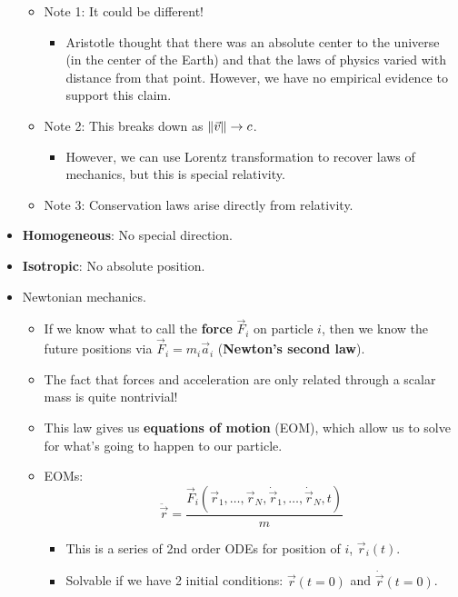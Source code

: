 \documentclass[../notes.tex]{subfiles}
\begin{document}
\begin{itemize}
\begin{itemize}
        \item Note 1: It could be different!
        \begin{itemize}
            \item Aristotle thought that there was an absolute center to the universe (in the center of the Earth) and that the laws of physics varied with distance from that point. However, we have no empirical evidence to support this claim.
        \end{itemize}
        \item Note 2: This breaks down as $\norm{\vec{v}}\to c$.
        \begin{itemize}
            \item However, we can use Lorentz transformation to recover laws of mechanics, but this is special relativity.
        \end{itemize}
        \item Note 3: Conservation laws arise directly from relativity.
    \end{itemize}
    \item \textbf{Homogeneous}: No special direction.
    \item \textbf{Isotropic}: No absolute position.
    \item Newtonian mechanics.
    \begin{itemize}
        \item If we know what to call the \textbf{force} $\vec{F}_i$ on particle $i$, then we know the future positions via $\vec{F}_i=m_i\vec{a}_i$ (\textbf{Newton's second law}).
        \item The fact that forces and acceleration are only related through a scalar mass is quite nontrivial!
        \item This law gives us \textbf{equations of motion} (EOM), which allow us to solve for what's going to happen to our particle.
        \item EOMs:
        \begin{equation*}
            \ddot{\vec{r}} = \frac{\vec{F}_i(\vec{r}_1,\dots,\vec{r}_N,\dot{\vec{r}}_1,\dots,\dot{\vec{r}}_N,t)}{m}
        \end{equation*}
        \begin{itemize}
            \item This is a series of 2nd order ODEs for position of $i$, $\vec{r}_i(t)$.
            \item Solvable if we have 2 initial conditions: $\vec{r}(t=0)$ and $\dot{\vec{r}}(t=0)$.
        \end{itemize}

\end{itemize}
\end{itemize}
\end{document}
